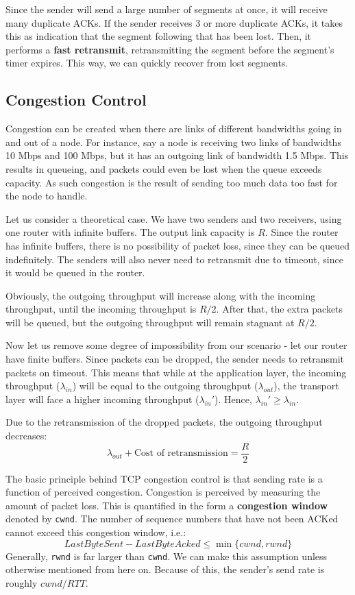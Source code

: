 \documentclass[12pt,letterpaper]{book}
\theoremstyle{definition}
\begin{document}
Since the sender will send a large number of segments at once, it will receive many duplicate ACKs. If the sender receives 3 or more duplicate ACKs, it takes this as indication that the segment following that has been lost. Then, it performs a \textbf{fast retransmit}, retransmitting the segment before the segment's timer expires. This way, we can quickly recover from lost segments.

\subsection{Congestion Control}

Congestion can be created when there are links of different bandwidths going in and out of a node. For instance, say a node is receiving two links of bandwidths 10 Mbps and 100 Mbps, but it has an outgoing link of bandwidth 1.5 Mbps.  This results in queueing, and packets could even be lost when the queue exceeds capacity. As such congestion is the result of sending too much data too fast for the node to handle.

Let us consider a theoretical case. We have two senders and two receivers, using one router with infinite buffers. The output link capacity is $R$. Since the router has infinite buffers, there is no possibility of packet loss, since they can be queued indefinitely. The senders will also never need to retransmit due to timeout, since it would be queued in the router.

Obviously, the outgoing throughput will increase along with the incoming throughput, until the incoming throughput is $R/2$. After that, the extra packets will be queued, but the outgoing throughput will remain stagnant at $R/2$.

Now let us remove some degree of impossibility from our scenario - let our router have finite buffers. Since packets can be dropped, the sender needs to retransmit packets on timeout. This means that while at the application layer, the incoming throughput ($\lambda_{in}$) will be equal to the outgoing throughput ($\lambda_{out}$), the transport layer will face a higher incoming throughput ($\lambda_{in}'$). Hence, $\lambda_{in}' \geq \lambda_{in}$.

Due to the retransmission of the dropped packets, the outgoing throughput decreases:
\[\lambda_{out} + \text{Cost of retransmission} = \frac{R}{2}\]

The basic principle behind TCP congestion control is that sending rate is a function of perceived congestion. Congestion is perceived by measuring the amount of packet loss. This is quantified in the form a \textbf{congestion window} denoted by \texttt{cwnd}. The number of sequence numbers that have not been ACKed cannot exceed this congestion window, i.e.:
\[LastByteSent - LastByteAcked \leq \min \{cwnd,rwnd\}\]
Generally, \texttt{rwnd} is far larger than \texttt{cwnd}. We can make this assumption unless otherwise mentioned from here on. Because of this, the sender's send rate is roughly $cwnd/RTT$.
\end{document}
